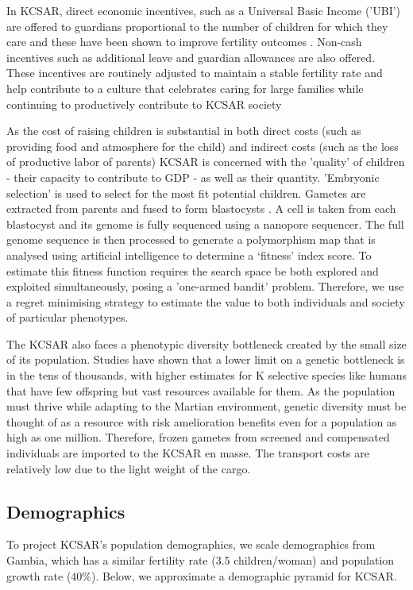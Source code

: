 \documentclass[fleqn,10pt]{Stylesheet} %
\begin{document}
In KCSAR, direct economic incentives, such as a Universal Basic Income ('UBI') are offered to guardians proportional to the number of children for which they care and these have been shown to improve fertility outcomes \cite{Kalwij} \cite{Bjorklund}. Non-cash incentives such as additional leave and guardian allowances are also offered. These incentives are routinely adjusted to maintain a stable fertility rate and help contribute to a culture that celebrates caring for large families while continuing to productively contribute to KCSAR society 
        
As the cost of raising children is substantial in both direct costs (such as providing food and atmosphere for the child) and indirect costs (such as the loss of productive labor of parents) KCSAR is concerned with the 'quality' of children - their capacity to contribute to GDP - as well as their quantity. 'Embryonic selection' is used to select for the most fit potential children. Gametes are extracted from parents and fused to form blastocysts \cite{Shulman}. A cell is taken from each blastocyst and its genome is fully sequenced using a nanopore sequencer. The full genome sequence is then processed to generate a polymorphism map that is analysed using artificial intelligence to determine a ‘fitness’ index score. To estimate this fitness function requires the search space be both explored and exploited simultaneously, posing a 'one-armed bandit' problem. Therefore, we use a regret minimising strategy to estimate the value to both individuals and society of particular phenotypes.

The KCSAR also faces a phenotypic diversity bottleneck created by the small size of its population. Studies have shown that a lower limit on a genetic bottleneck is in the tens of thousands, with higher estimates for K selective species like humans that have few offspring but vast resources available for them. As the population must thrive while adapting to the Martian environment, genetic diversity must be thought of as a resource with risk amelioration benefits even for a population as high as one million. Therefore, frozen gametes from screened and compensated individuals are imported to the KCSAR en masse. The transport costs are relatively low due to the light weight of the cargo.

\subsection{Demographics}
To project KCSAR's population demographics, we scale demographics from Gambia, which has a similar fertility rate (3.5 children/woman) and population growth rate (40\%). \cite{Gambia} Below, we approximate a demographic pyramid for KCSAR.
\end{document}
